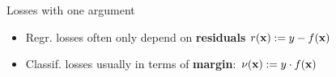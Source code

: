 \documentclass[11pt,compress,t,notes=noshow, xcolor=table]{beamer}
\begin{document}
\begin{vbframe}{Losses with one argument}


\begin{itemize}

\item Regr. losses often only depend on  \textbf{residuals} 
$r(\mathbf{x}) := y - f(\mathbf{x})$

\item Classif. losses usually in terms of 
  \textbf{margin}: $\nu(\mathbf{x}) := y \cdot f(\mathbf{x})$


\end{itemize}

\vfill





\end{vbframe}
\end{document}
